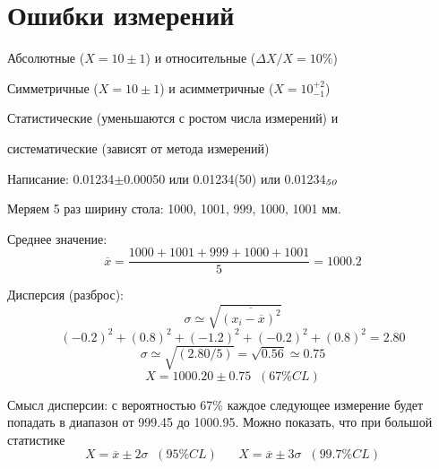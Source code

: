 \section{Ошибки измерений}

 Абсолютные ($X =10\pm1$) и относительные ($\Delta X/X=10\%$)\vspace{4mm}

 Симметричные ($X =10\pm1$) и асимметричные ($X=10^{+2}_{-1}$)\vspace{4mm}

 Статистические (уменьшаются с ростом числа измерений) и \vspace{4mm}

 систематические (зависят от метода измерений)\vspace{4mm}

 Написание: 0.01234$\pm$0.00050 или 0.01234(50) или 0.01234$_{\it 50}$\vspace{4mm}

 Меряем 5 раз ширину стола: 1000, 1001, 999, 1000, 1001 мм.\vspace{5mm}

 Среднее значение:
 \begin{displaymath}
\overline{x} = \frac{1000 + 1001 + 999 + 1000 + 1001}{5} = 1000.2
 \end{displaymath}

 Дисперсия (разброс):
 \begin{displaymath}
\sigma \simeq \sqrt{\overline{\left( x_i-\overline{x} \right)^2}}
 \end{displaymath}
 \begin{displaymath}
(-0.2)^2 +(0.8)^2 + (-1.2)^2 + (-0.2)^2 + (0.8)^2 = 2.80
 \end{displaymath}
 \begin{displaymath}
\sigma \simeq \sqrt{(2.80/5)}=\sqrt{0.56} \simeq 0.75
 \end{displaymath}
 \begin{displaymath}
X = 1000.20\pm 0.75 \;\;(67\%CL)
 \end{displaymath}

Смысл дисперсии: с вероятностью 67\% каждое следующее измерение будет попадать в диапазон от 999.45 до 1000.95. Можно показать, что при большой статистике
\begin{displaymath}
X = \overline{x}\pm 2\sigma \;\;(95\%CL)\;\;\;\;\;\;X = \overline{x}\pm 3\sigma \;\;(99.7\%CL)
 \end{displaymath}

